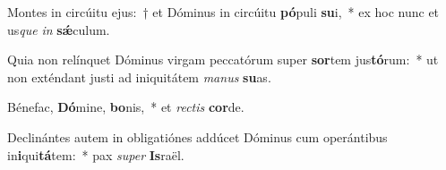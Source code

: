 \item Montes in circúitu ejus:~† et Dóminus in circúitu \textbf{pó}puli \textbf{su}i,~* ex hoc nunc et us\textit{que} \textit{in} \textbf{sǽ}culum.
\item Quia non relínquet Dóminus virgam peccatórum super \textbf{sor}tem jus\textbf{tó}rum:~* ut non exténdant justi ad iniquitátem \textit{ma}\textit{nus} \textbf{su}as.
\item Bénefac, \textbf{Dó}mine, \textbf{bo}nis,~* et \textit{rec}\textit{tis} \textbf{cor}de.
\item Declinántes autem in obligatiónes addúcet Dóminus cum operántibus in\textbf{i}qui\textbf{tá}tem:~* pax \textit{su}\textit{per} \textbf{Is}raël.
